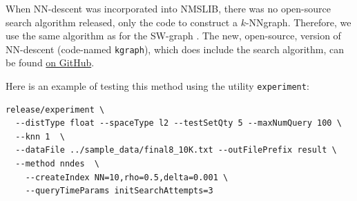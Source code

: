 \documentclass[runningheads,a4paper]{llncs}
\newcommand{\ttt}[1]{\texttt{#1}}
\newcommand{\knnns}{$k$-NN}
\begin{document}
When NN-descent was incorporated into NMSLIB, 
there was no open-source search algorithm released, only the code to construct a \knnns graph.
Therefore, we use the same algorithm as for the SW-graph \cite{malkov2012scalable,malkov2014}.
The new, open-source, version of NN-descent (code-named \ttt{kgraph}), 
which does include the search algorithm,
can be found \href{https://github.com/aaalgo/kgraph}{on GitHub}.

Here is an example of testing this method using the utility \ttt{experiment}:
{
\footnotesize
\begin{verbatim}
release/experiment \
  --distType float --spaceType l2 --testSetQty 5 --maxNumQuery 100 \
  --knn 1  \
  --dataFile ../sample_data/final8_10K.txt --outFilePrefix result \
  --method nndes  \
    --createIndex NN=10,rho=0.5,delta=0.001 \
    --queryTimeParams initSearchAttempts=3
\end{verbatim}
}
\end{document}
